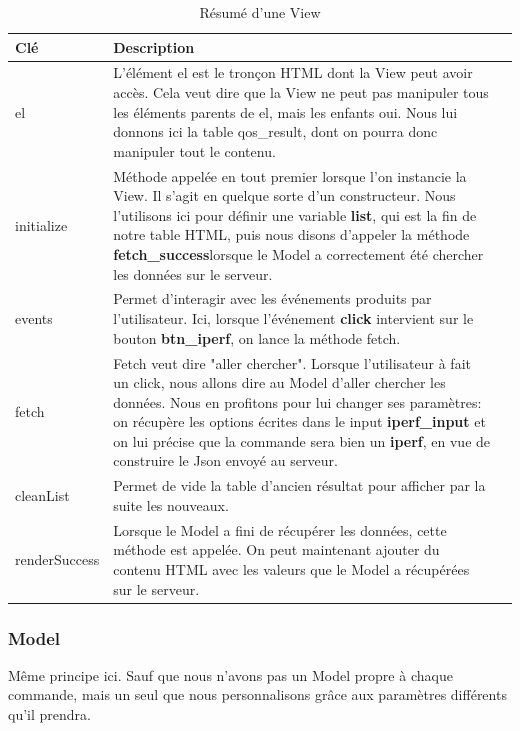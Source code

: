 \begin{table}[H]
\begin{tabularx}{\textwidth}{|m{3cm}|X|l|}
  \hline
  \bf{Clé} & \bf{Description} \\
  \hline
  el & L'élément el est le tronçon HTML dont la View peut avoir accès. Cela veut dire que la View ne peut pas manipuler tous les éléments parents de el, mais les enfants oui. Nous lui donnons ici la table qos\_result, dont on pourra donc manipuler tout le contenu.\\
  \hline  
  initialize & Méthode appelée en tout premier lorsque l'on instancie la View. Il s'agit en quelque sorte d'un constructeur. Nous l'utilisons ici pour définir une variable \textbf{list}, qui est la fin de notre table HTML, puis nous disons d'appeler la méthode \textbf{fetch\_success}lorsque le Model a correctement été chercher les données sur le serveur.\\
  \hline  
  events & Permet d'interagir avec les événements produits par l'utilisateur. Ici, lorsque l'événement \textbf{click} intervient sur le bouton \textbf{btn\_iperf}, on lance la méthode fetch.\\
  \hline  
  fetch & Fetch veut dire "aller chercher". Lorsque l'utilisateur à fait un click, nous allons dire au Model d'aller chercher les données. Nous en profitons pour lui changer ses paramètres: on récupère les options écrites dans le input \textbf{iperf\_input} et on lui précise que la commande sera bien un \textbf{iperf}, en vue de construire le Json envoyé au serveur.\\
  \hline  
  cleanList & Permet de vide la table d'ancien résultat pour afficher par la suite les nouveaux.\\
  \hline 
  renderSuccess & Lorsque le Model a fini de récupérer les données, cette méthode est appelée. On peut maintenant ajouter du contenu HTML avec les valeurs que le Model a récupérées sur le serveur.
 \end{tabularx}
\caption{Résumé d'une View}
\label{tab:classDiagram}
\end{table}

\subsubsection{Model}
Même principe ici. Sauf que nous n'avons pas un Model propre à chaque commande, mais un seul que nous personnalisons grâce aux paramètres différents qu'il prendra.

